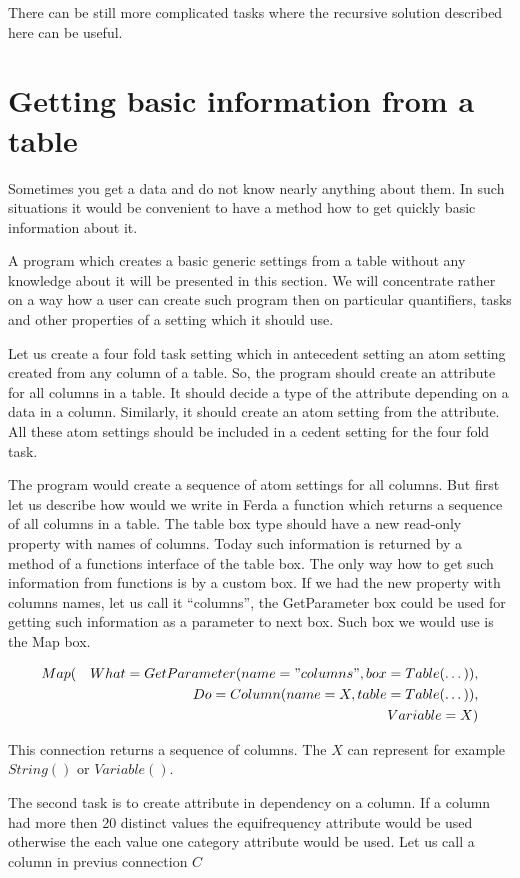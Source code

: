 \documentclass[a4paper,12pt]{book}
\begin{document}
There can be still more complicated tasks where the recursive solution described here can be useful.

\section{Getting basic information from a table}
Sometimes you get a data and do not know nearly anything about them. In such situations it would be convenient to have a method how to get quickly basic information about it.

A program which creates a basic generic settings from a table without any knowledge about it will be presented in this section. We will concentrate rather on a way how a user can create such program then on particular quantifiers, tasks and other properties of a setting which it should use.

Let us create a four fold task setting which in antecedent setting an atom setting created from any column of a table. So, the program should create an attribute for all columns in a table. It should decide a type of the attribute depending on a data in a column. Similarly, it should create an atom setting from the attribute. All these atom settings should be included in a cedent setting for the four fold task.

The program would create a sequence of atom settings for all columns. But first let us describe how would we write in Ferda a function which returns a sequence of all columns in a table. The table box type should have a new read-only property with names of columns. Today such information is returned by a method of a functions interface of the table box. The only way how to get such information from functions is by a custom box. If we had the new property with columns names, let us call it ``columns'', the GetParameter box could be used for getting such information as a parameter to next box. Such box we would use is the Map box.

\begin{eqnarray*}
Map(&&What=GetParameter(name="columns", box=Table(\dots)), \\&& Do=Column(name=X, table=Table(\dots)), \\&& Variable=X)
\end{eqnarray*}

This connection returns a sequence of columns. The $X$ can represent for example $String()$ or $Variable()$.

The second task is to create attribute in dependency on a column. If a column had more then 20 distinct values the equifrequency attribute would be used otherwise the each value one category attribute would be used. Let us call a column in previus connection $C$
\end{document}
